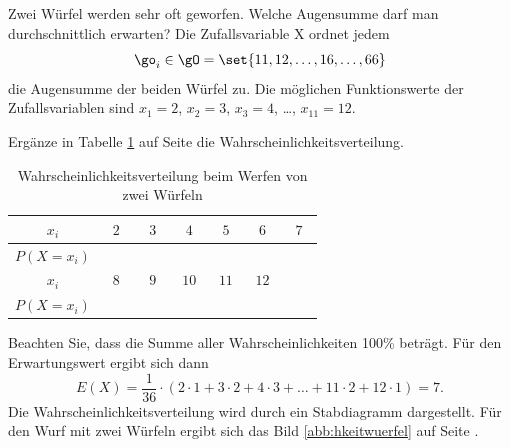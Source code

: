 \documentclass[%
11pt,%
twoside,%
titlepage,%
german,%
headsepline%
]{scrartcl}
\newcommand{\spaltenheight}{\rule{0mm}{3ex}}
\newcommand{\spaltensep}{\\[1ex]}
\begin{document}
\begin{bsp}
Zwei Würfel werden sehr oft geworfen. Welche Augensumme darf man durchschnittlich erwarten? Die Zufallsvariable X ordnet jedem 
$$\go_i\in\gO=\set{11,12,\dots,16,\dots,66}$$
die Augensumme der beiden Würfel zu. Die möglichen Funktionswerte der Zufallsvariablen sind $x_1=2$, $x_2=3$, $x_3=4$, \dots, $x_{11}=12$.

\begin{ueb}
Ergänze in Tabelle \ref{tab:wuerfeln} auf Seite \pageref{tab:wuerfeln} die Wahrscheinlichkeitsverteilung.

\begin{table}
\begin{center}
\begin{tabular}{|c|c|c|c|c|c|c|}
\hline
\rowcolor{Gray}\spaltenheight $\;\; x_i\;\;$ & $\;\;2\;\;$ & $\;\;3\;\;$ & $\;\;4\;\;$ & $\;\;5\;\;$ & $\;\;6\;\;$ & $\;\;7\;\;$\spaltensep \hline
\rowcolor{lightyellow}\rule{0mm}{3ex} $P(X=x_i)$ &  & & & & & \\[3ex] \hline
\rowcolor{Gray}\spaltenheight $\;\; x_i\;\;$ & $\;\;8\;\;$ & $\;\;9\;\;$ & $\;10\;$ & $\;11\;$ & $\;12\;$ & \phantom{$\;12\;$}\spaltensep \hline
\rowcolor{lightyellow}\rule{0mm}{3ex} $P(X=x_i)$ &  & & & & & \\[3ex] \hline
\end{tabular}
\end{center}
\caption{Wahrscheinlichkeitsverteilung beim Werfen von zwei Würfeln}\label{tab:wuerfeln}
\end{table}
\end{ueb}

Beachten Sie, dass die Summe aller Wahrscheinlichkeiten 100\% beträgt. Für den Erwartungswert ergibt sich dann
$$E(X) = \frac{1}{36}\cdot(2\cdot1 + 3\cdot2 + 4\cdot3 + \ldots + 11\cdot2 + 12\cdot1) = 7.$$
Die	Wahrscheinlichkeitsverteilung wird durch ein Stabdiagramm dargestellt. Für den Wurf mit zwei Würfeln ergibt sich das Bild \ref{abb:hkeitwuerfel} auf Seite \pageref{abb:hkeitwuerfel}.


\end{bsp}
\end{document}
